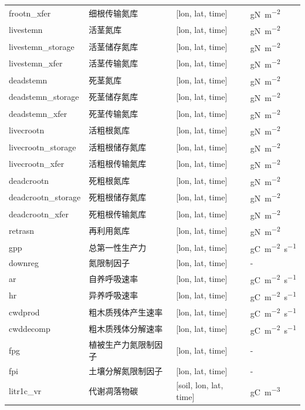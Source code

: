 \documentclass[a4paper,12pt,twoside]{article}
\begin{document}
{\begin{longtable}[htbp]{lp{}ll}
frootn\_xfer     & 细根传输氮库 & {[}lon, lat, time{]} & \unit{gN.m^{-2}} \\
livestemn      & 活茎氮库 & {[}lon, lat, time{]}  & \unit{gN.m^{-2}} \\
livestemn\_storage  & 活茎储存氮库 & {[}lon, lat, time{]} & \unit{gN.m^{-2}} \\
livestemn\_xfer   & 活茎传输氮库 & {[}lon, lat, time{]} & \unit{gN.m^{-2}} \\
deadstemn      & 死茎氮库 & {[}lon, lat, time{]}  & \unit{gN.m^{-2}} \\
deadstemn\_storage  & 死茎储存氮库 & {[}lon, lat, time{]} & \unit{gN.m^{-2}} \\
deadstemn\_xfer   & 死茎传输氮库 & {[}lon, lat, time{]} & \unit{gN.m^{-2}} \\
livecrootn & 活粗根氮库 & {[}lon, lat, time{]}  & \unit{gN.m^{-2}} \\
livecrootn\_storage & 活粗根储存氮库 & {[}lon, lat, time{]} & \unit{gN.m^{-2}} \\
livecrootn\_xfer & 活粗根传输氮库 & {[}lon, lat, time{]}  & \unit{gN.m^{-2}} \\
deadcrootn & 死粗根氮库 & {[}lon, lat, time{]}  & \unit{gN.m^{-2}} \\
deadcrootn\_storage & 死粗根储存氮库 & {[}lon, lat, time{]} & \unit{gN.m^{-2}} \\
deadcrootn\_xfer & 死粗根传输氮库 & {[}lon, lat, time{]}  & \unit{gN.m^{-2}} \\
retrasn & 再利用氮库 & {[}lon, lat, time{]}  & \unit{gN.m^{-2}} \\
gpp & 总第一性生产力 & {[}lon, lat, time{]}  & \unit{gC.m^{-2}.s^{-1}} \\
downreg & 氮限制因子 & {[}lon, lat, time{]}  & - \\
ar & 自养呼吸速率 & {[}lon, lat, time{]}  & \unit{gC.m^{-2}.s^{-1}} \\
hr & 异养呼吸速率 &  {[}lon, lat, time{]}  & \unit{gC.m^{-2}.s^{-1}} \\
cwdprod & 粗木质残体产生速率 &  {[}lon, lat, time{]}  & \unit{gC.m^{-2}.s^{-1}} \\
cwddecomp & 粗木质残体分解速率 &  {[}lon, lat, time{]}  & \unit{gC.m^{-2}.s^{-1}} \\
fpg & 植被生产力氮限制因子 &  {[}lon, lat, time{]}  & - \\
fpi & 土壤分解氮限制因子 &  {[}lon, lat, time{]}  & - \\
litr1c\_vr & 代谢凋落物碳 & {[}soil, lon, lat, time{]}  & \unit{gC.m^{-3}} \\

\end{longtable}}
\end{document}

